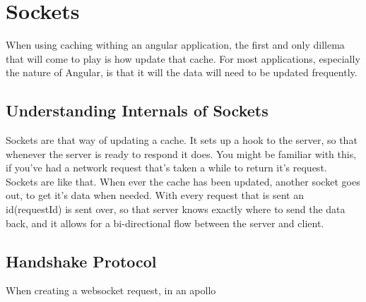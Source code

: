 \maketitle{}
\section{ Sockets }

When using caching withing an angular application, the first and only dillema
that will come to play is how update that cache. For most applications,
especially the nature of Angular, is that it will the data will need to be
updated frequently.

\subsection{ Understanding Internals of Sockets }
Sockets are that way of updating a cache. It sets up a hook
to the server, so that whenever the server is ready to respond it does. You
might be familiar with this, if you've had a network request that's taken a
while to return it's request. Sockets are like that. When ever the cache has
been updated, another socket goes out, to get it's data when needed. With
every request that is sent an id(requestId) is sent over, so that server knows
exactly where to send the data back, and it allows for a bi-directional flow
between the server and client.

\subsection{ Handshake Protocol }
When creating a websocket request, in an apollo  

